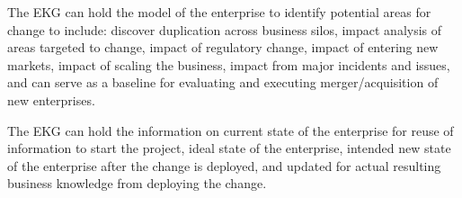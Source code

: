 The EKG can hold the model of the enterprise to identify potential areas for change to include:
discover duplication across business silos, impact analysis of areas targeted to change,
impact of regulatory change, impact of entering new markets, impact of scaling the business,
impact from major incidents and issues, and can serve as a baseline for evaluating and executing
merger/acquisition of new enterprises.

The EKG can hold the information on current state of the enterprise for reuse of information to start the project,
ideal state of the enterprise, intended new state of the enterprise after the change is deployed,
and updated for actual resulting business knowledge from deploying the change.
